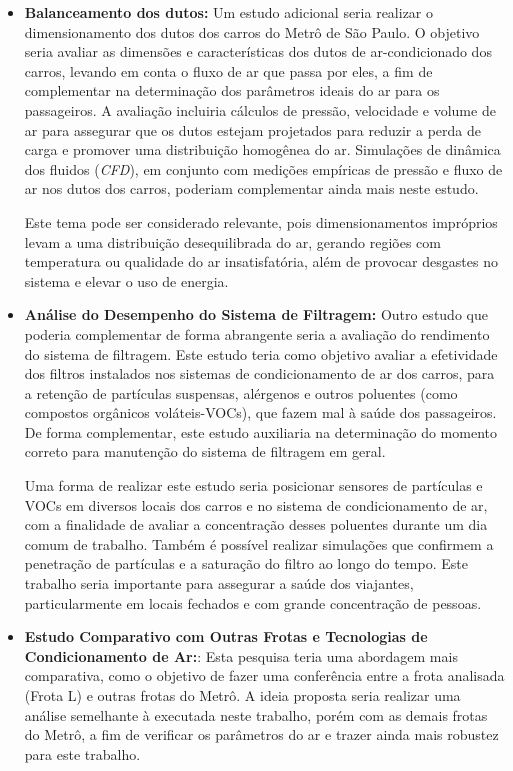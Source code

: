 \documentclass[acronym,symbols,table]{fei}
\begin{document}
\begin{itemize}[label=\arabic*.]
\item \textbf{Balanceamento dos dutos:} Um estudo adicional seria realizar o dimensionamento dos dutos dos carros do Metrô de São Paulo. O objetivo seria avaliar as dimensões e características dos dutos de ar-condicionado dos carros, levando em conta o fluxo de ar que passa por eles, a fim de complementar na determinação dos parâmetros ideais do ar para os passageiros. A avaliação incluiria cálculos de pressão, velocidade e volume de ar para assegurar que os dutos estejam projetados para reduzir a perda de carga e promover uma distribuição homogênea do ar. Simulações de dinâmica dos fluidos (\textit{CFD}), em conjunto com medições empíricas de pressão e fluxo de ar nos dutos dos carros, poderiam complementar ainda mais neste estudo. 

Este tema pode ser considerado relevante, pois dimensionamentos impróprios levam a uma distribuição desequilibrada do ar, gerando regiões com temperatura ou qualidade do ar insatisfatória, além de provocar desgastes no sistema e elevar o uso de energia. 
 
\item \textbf{Análise do Desempenho do Sistema de Filtragem:} Outro estudo que poderia complementar de forma abrangente seria a avaliação do rendimento do sistema de filtragem. Este estudo teria como objetivo avaliar a efetividade dos filtros instalados nos sistemas de condicionamento de ar dos carros, para a retenção de partículas suspensas, alérgenos e outros poluentes (como compostos orgânicos voláteis-VOCs), que fazem mal à saúde dos passageiros. De forma complementar, este estudo auxiliaria na determinação do momento correto para manutenção do sistema de filtragem em geral.

Uma forma de realizar este estudo seria posicionar sensores de partículas e VOCs em diversos locais dos carros e no sistema de condicionamento de ar, com a finalidade de avaliar a concentração desses poluentes durante um dia comum de trabalho. Também é possível realizar simulações que confirmem a penetração de partículas e a saturação do filtro ao longo do tempo. Este trabalho seria importante para assegurar a saúde dos viajantes, particularmente em locais fechados e com grande concentração de pessoas.

\item \textbf{Estudo Comparativo com Outras Frotas e Tecnologias de Condicionamento de Ar:}: Esta pesquisa teria uma abordagem mais comparativa, como o objetivo de fazer uma conferência entre a frota analisada (Frota L) e outras frotas do Metrô. A ideia proposta seria realizar uma análise semelhante à executada neste trabalho, porém com as demais frotas do Metrô, a fim de verificar os parâmetros do ar e trazer ainda mais robustez para este trabalho.


\end{itemize}
\end{document}
